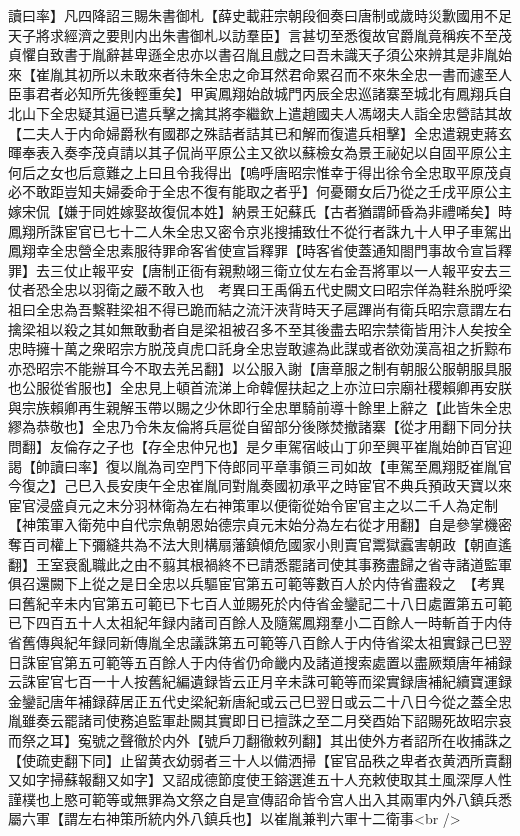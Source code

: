 讀曰率】凡四降詔三賜朱書御札【薛史載莊宗朝段徊奏曰唐制或歲時災歉國用不足天子將求經濟之要則内出朱書御札以訪羣臣】言甚切至悉復故官爵胤竟稱疾不至茂貞懼自致書于胤辭甚卑遜全忠亦以書召胤且戲之曰吾未識天子須公來辨其是非胤始來【崔胤其初所以未敢來者待朱全忠之命耳然君命累召而不來朱全忠一書而遽至人臣事君者必知所先後輕重矣】甲寅鳳翔始啟城門丙辰全忠巡諸寨至城北有鳳翔兵自北山下全忠疑其逼已遣兵擊之擒其將李繼欽上遣趙國夫人馮翊夫人詣全忠營詰其故【二夫人于内命婦爵秋有國郡之殊詰者詰其已和解而復遣兵相擊】全忠遣親吏蔣玄暉奉表入奏李茂貞請以其子侃尚平原公主又欲以蘇檢女為景王祕妃以自固平原公主何后之女也后意難之上曰且令我得出【嗚呼唐昭宗惟幸于得出徐令全忠取平原茂貞必不敢距豈知夫婦委命于全忠不復有能取之者乎】何憂爾女后乃從之壬戌平原公主嫁宋侃【嫌于同姓嫁娶故復侃本姓】納景王妃蘇氏【古者猶謂師昏為非禮唏矣】時鳳翔所誅宦官已七十二人朱全忠又密令京兆搜捕致仕不從行者誅九十人甲子車駕出鳳翔幸全忠營全忠素服待罪命客省使宣旨釋罪【時客省使蓋通知閤門事故令宣旨釋罪】去三仗止報平安【唐制正衙有親勲翊三衛立仗左右金吾將軍以一人報平安去三仗者恐全忠以羽衛之嚴不敢入也　考異曰王禹偁五代史闕文曰昭宗佯為鞋糸脱呼梁祖曰全忠為吾繫鞋梁祖不得已跪而結之流汗浹背時天子扈蹕尚有衛兵昭宗意謂左右擒梁祖以殺之其如無敢動者自是梁祖被召多不至其後盡去昭宗禁衛皆用汴人矣按全忠時擁十萬之衆昭宗方脱茂貞虎口託身全忠豈敢遽為此謀或者欲効漢高祖之折黥布亦恐昭宗不能辦耳今不取去羌呂翻】以公服入謝【唐章服之制有朝服公服朝服具服也公服從省服也】全忠見上頓首流涕上命韓偓扶起之上亦泣曰宗廟社稷賴卿再安朕與宗族賴卿再生親解玉帶以賜之少休即行全忠單騎前導十餘里上辭之【此皆朱全忠繆為恭敬也】全忠乃令朱友倫將兵扈從自留部分後隊焚撤諸寨【從才用翻下同分扶問翻】友倫存之子也【存全忠仲兄也】是夕車駕宿岐山丁卯至興平崔胤始帥百官迎謁【帥讀曰率】復以胤為司空門下侍郎同平章事領三司如故【車駕至鳳翔貶崔胤官今復之】己巳入長安庚午全忠崔胤同對胤奏國初承平之時宦官不典兵預政天寶以來宦官浸盛貞元之末分羽林衛為左右神策軍以便衛從始令宦官主之以二千人為定制【神策軍入衛苑中自代宗魚朝恩始德宗貞元末始分為左右從才用翻】自是參掌機密奪百司權上下彌縫共為不法大則構扇藩鎮傾危國家小則賣官鬻獄蠧害朝政【朝直遙翻】王室衰亂職此之由不翦其根禍終不已請悉罷諸司使其事務盡歸之省寺諸道監軍俱召還闕下上從之是日全忠以兵驅宦官第五可範等數百人於内侍省盡殺之　【考異曰舊紀辛未内官第五可範已下七百人並賜死於内侍省金鑾記二十八日處置第五可範已下四百五十人太祖紀年録内諸司百餘人及隨駕鳳翔羣小二百餘人一時斬首于内侍省舊傳與紀年録同新傳胤全忠議誅第五可範等八百餘人于内侍省梁太祖實録己巳翌日誅宦官第五可範等五百餘人于内侍省仍命畿内及諸道搜索處置以盡厥類唐年補録云誅宦官七百一十人按舊紀編遺録皆云正月辛未誅可範等而梁實録唐補紀續寶運録金鑾記唐年補録薛居正五代史梁紀新唐紀或云己巳翌日或云二十八日今從之蓋全忠胤雖奏云罷諸司使務追監軍赴闕其實即日已擅誅之至二月癸酉始下詔賜死故昭宗哀而祭之耳】寃號之聲徹於内外【號戶刀翻徹敕列翻】其出使外方者詔所在收捕誅之【使疏吏翻下同】止留黄衣幼弱者三十人以備洒掃【宦官品秩之卑者衣黄洒所賣翻又如字掃蘇報翻又如字】又詔成德節度使王鎔選進五十人充敕使取其土風深厚人性謹樸也上愍可範等或無罪為文祭之自是宣傳詔命皆令宫人出入其兩軍内外八鎮兵悉屬六軍【謂左右神策所統内外八鎮兵也】以崔胤兼判六軍十二衛事<br />
